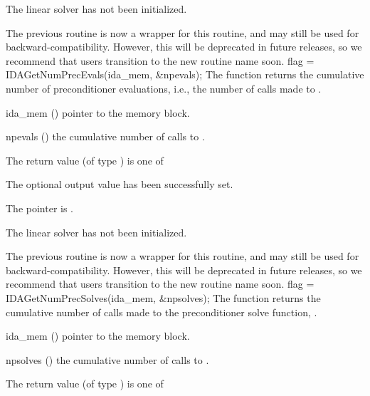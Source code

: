 {{\begin{args}
  \item[\Id{IDALS\_LMEM\_NULL}]
    The {\idals} linear solver has not been initialized.
  \end{args}
}
{
  The previous routine  is now a wrapper for
  this routine, and may still be used for backward-compatibility.
  However, this will be deprecated in future releases, so we recommend
  that users transition to the new routine name soon.
}
{
  flag = IDAGetNumPrecEvals(ida\_mem, \&npevals);
}
{
  The function  returns the
  cumulative number of preconditioner evaluations, i.e., the number of
  calls made to .
}
{
  \begin{args}
  \item[ida\_mem] ()
    pointer to the {\ida} memory block.
  \item[npevals] ()
    the cumulative number of calls to .
  \end{args}
}
{
  The return value  (of type ) is one of
  \begin{args}
  \item[\Id{IDALS\_SUCCESS}]
    The optional output value has been successfully set.
  \item[\Id{IDALS\_MEM\_NULL}]
    The  pointer is .
  \item[\Id{IDALS\_LMEM\_NULL}]
    The {\idals} linear solver has not been initialized.
  \end{args}
}
{
  The previous routine  is now a wrapper for
  this routine, and may still be used for backward-compatibility.
  However, this will be deprecated in future releases, so we recommend
  that users transition to the new routine name soon.
}
{
  flag = IDAGetNumPrecSolves(ida\_mem, \&npsolves);
}
{
  The function  returns the
  cumulative number of calls made to the preconditioner
  solve function, .
}
{
  \begin{args}
  \item[ida\_mem] ()
    pointer to the {\ida} memory block.
  \item[npsolves] ()
    the cumulative number of calls to .
  \end{args}
}
{
  The return value  (of type ) is one of
  \begin{args}

\end{args}}}
